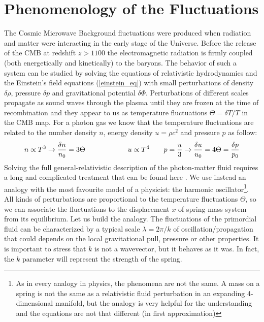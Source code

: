 \documentclass{article}
\begin{document}
\section{Phenomenology of the Fluctuations}
The Cosmic Microwave Background fluctuations were produced when radiation and matter were interacting in the early stage of the Universe.
Before the release of the CMB at redshift $z > 1100$ the electromagnetic radiation is firmly coupled (both energetically and kinetically) to the baryons.
The behavior of such a system can be studied by solving the equations of relativistic hydrodynamics and the Einstein's field equations (\ref{einstein_eq}) with small perturbations of density $\delta \rho$, pressure $\delta p$ and gravitational potential  $\delta \Phi$.
Perturbations of different scales propagate as sound waves through the plasma until they are frozen at the time of recombination and they appear to us as temperature fluctuations $\Theta = \delta T /T$ in the CMB map.
For a photon gas we know that the temperature fluctuations are related to the number density $n$, energy density $u = \rho c^2$ and pressure $p$ as follow:
\begin{equation}
n \propto T ^3 \rightarrow \dfrac{\delta n}{n_0} = 3 \Theta \qquad \qquad \qquad
 u \propto T^4  \qquad p  = \dfrac{u}{3} \rightarrow \dfrac{\delta u}{u_0} = 4 \Theta = \dfrac{\delta p}{p_0} \notag
\end{equation}
Solving the full general-relativistic description of the photon-matter fluid requires a long and complicated treatment that can be found here \cite{LecturesPdf,keskitaloEffectMatterBaryon}. We use instead an analogy with the most favourite model of a physicist: the harmonic oscillator\footnote{As in every analogy in physics, the phenomena are not the same. A mass on a spring is not the same as a relativistic fluid perturbation in an expanding 4-dimensional manifold, but the analogy is very helpful for the understanding and the equations are not that different (in first approximation)}.\\
All kinds of perturbations are proportional to the temperature fluctuations $\Theta$, so we  can associate the fluctuations to the displacement $x$ of spring-mass system from its equilibrium.
Let us build the analogy.
The fluctuations of the primordial fluid can be characterized by a typical scale $\lambda = 2 \pi /k$ of oscillation/propagation that could depends on the local gravitational pull, pressure or other properties.
It is important to stress that $k$ is not a wavevector, but it behaves as it was. 
In fact, the $k$ parameter will represent the strength of the spring.
\end{document}
